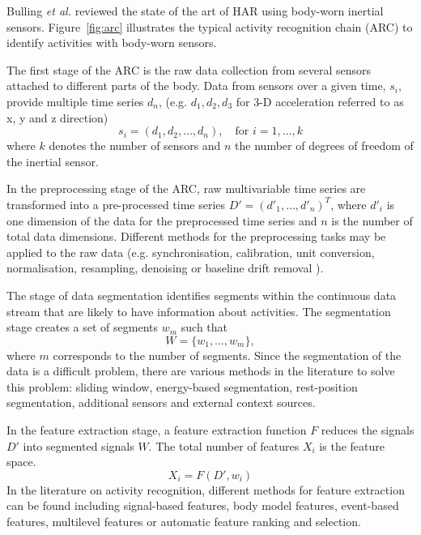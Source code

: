 \documentclass[10pt,journal,compsoc]{IEEEtran}
\begin{document}
Bulling \textit{et al.} \cite{bulling2014} reviewed the state of the art of HAR using 
body-worn inertial sensors. Figure~\ref{fig:arc} illustrates the typical 
activity recognition chain (ARC) to identify activities with 
body-worn sensors.

The first stage of the ARC is the raw data collection 
from several sensors attached to different parts of the body. 
Data from sensors over a given time, $s_i$, provide multiple time series $d_n$, 
(e.g. $d_1, d_2, d_3$ for 3-D acceleration referred to as x, y and z direction)
\begin{equation}
s_i = (d_1, d_2,\dots,d_n), \quad \mbox{for } i=1, \dots,k
\end{equation} 
where $k$ denotes the number of sensors and $n$ the number 
of degrees of freedom of the inertial sensor.

In the preprocessing stage of the ARC, raw multivariable time series 
are transformed into a pre-processed time series 
$D'= (d'_1, \dots, d'_n )^T$, where $d'_i$ is one dimension of the data 
for the preprocessed time series and $n$ is the number of total 
data dimensions. Different methods for the preprocessing 
tasks may be applied to the raw data (e.g. synchronisation, 
calibration, unit conversion, normalisation, resampling, 
denoising  or baseline drift removal \cite{bulling2014}).

The stage of data segmentation identifies segments 
within the continuous data stream that are likely to have 
information about activities. The segmentation stage creates 
a set of segments $w_m$ such that 
\begin{equation}
W = \{   w_1, \dots, w_m  \},
\end{equation} 
where $m$ corresponds to the number of segments. Since the 
segmentation of the data is a difficult problem, there are 
various methods in the literature to solve this problem: sliding 
window, energy-based segmentation, rest-position segmentation, 
additional sensors and external context sources.

In the feature extraction stage, a feature extraction function 
$F$ reduces the signals $D'$  into segmented signals $W$.
The total number of features $X_i$ is the feature space.
\begin{equation}
X_i = F ( D', w_i)
\end{equation} 
In the literature on activity recognition, different methods 
for feature extraction can be found including signal-based 
features, body model features, event-based features, 
multilevel features or automatic feature ranking and selection.
\end{document}
